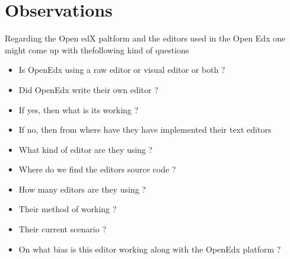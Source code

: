 \section{Observations}
Regarding the Open edX paltform and the editors used in the Open Edx one might come up with thefollowing kind of questions
\begin{itemize}
\item Is OpenEdx using a raw editor or visual editor or both ?
\item Did OpenEdx write their own editor ?
\item If yes, then what is its working ?
\item If no, then from where have they have implemented their text editors
\item What kind of editor are they using ?
\item Where do we find the editors source code ?
\item How many editors are they using ?
\item Their method of working ?
\item Their current scenario ?
\item On what bias is this editor working along with the OpenEdx platform ?\newline\newline
\end{itemize}


